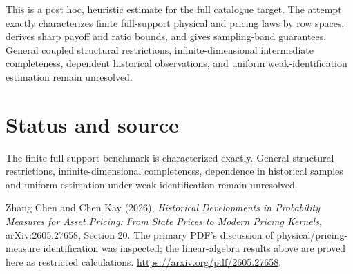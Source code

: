 \documentclass[11pt]{article}
\begin{document}
This is a post hoc, heuristic estimate for the full catalogue target.
The attempt exactly characterizes finite full-support physical and pricing laws by row spaces, derives sharp payoff and ratio bounds, and gives sampling-band guarantees. General coupled structural restrictions, infinite-dimensional intermediate completeness, dependent historical observations, and uniform weak-identification estimation remain unresolved.

\section*{Status and source}
The finite full-support benchmark is characterized exactly. General structural restrictions, infinite-dimensional completeness, dependence in historical samples and uniform estimation under weak identification remain unresolved.

Zhang Chen and Chen Kay (2026), \emph{Historical Developments in Probability Measures for Asset Pricing: From State Prices to Modern Pricing Kernels}, arXiv:2605.27658, Section 20. The primary PDF's discussion of physical/pricing-measure identification was inspected; the linear-algebra results above are proved here as restricted calculations. \url{https://arxiv.org/pdf/2605.27658}.
\end{document}
